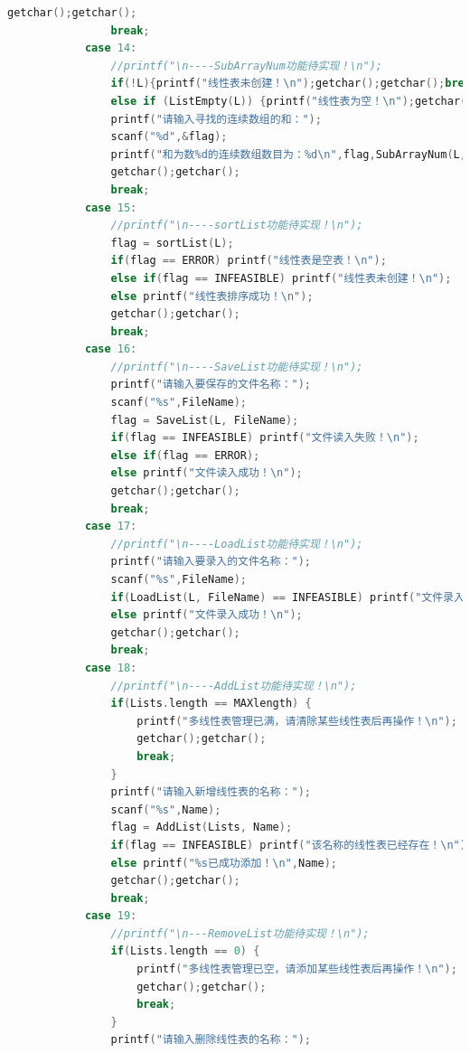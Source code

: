 \documentclass[supercite]{Experimental_Report}
\theoremstyle{definition}
\begin{document}
\begin{lstlisting}[language=c]
                getchar();getchar();
                break;
            case 14:
                //printf("\n----SubArrayNum功能待实现！\n");
                if(!L){printf("线性表未创建！\n");getchar();getchar();break;}
                else if (ListEmpty(L)) {printf("线性表为空！\n");getchar();getchar();break;}
                printf("请输入寻找的连续数组的和：");
                scanf("%d",&flag);
                printf("和为数%d的连续数组数目为：%d\n",flag,SubArrayNum(L,flag));
                getchar();getchar();
                break;
            case 15:
                //printf("\n----sortList功能待实现！\n");
                flag = sortList(L);
                if(flag == ERROR) printf("线性表是空表！\n");
                else if(flag == INFEASIBLE) printf("线性表未创建！\n");
                else printf("线性表排序成功！\n");
                getchar();getchar();
                break;
            case 16:
                //printf("\n----SaveList功能待实现！\n");
                printf("请输入要保存的文件名称：");
                scanf("%s",FileName);
                flag = SaveList(L, FileName);
                if(flag == INFEASIBLE) printf("文件读入失败！\n");
                else if(flag == ERROR);
                else printf("文件读入成功！\n");
                getchar();getchar();
                break;
            case 17:
                //printf("\n----LoadList功能待实现！\n");
                printf("请输入要录入的文件名称：");
                scanf("%s",FileName);
                if(LoadList(L, FileName) == INFEASIBLE) printf("文件录入失败！\n");
                else printf("文件录入成功！\n");
                getchar();getchar();
                break;
            case 18:
                //printf("\n----AddList功能待实现！\n");
                if(Lists.length == MAXlength) {
                    printf("多线性表管理已满，请清除某些线性表后再操作！\n");
                    getchar();getchar();
                    break;
                }
                printf("请输入新增线性表的名称：");
                scanf("%s",Name);
                flag = AddList(Lists, Name);
                if(flag == INFEASIBLE) printf("该名称的线性表已经存在！\n");
                else printf("%s已成功添加！\n",Name);
                getchar();getchar();
                break;
            case 19:
                //printf("\n---RemoveList功能待实现！\n");
                if(Lists.length == 0) {
                    printf("多线性表管理已空，请添加某些线性表后再操作！\n");
                    getchar();getchar();
                    break;
                }
                printf("请输入删除线性表的名称：");

\end{lstlisting}
\end{document}
